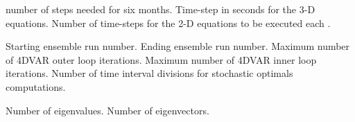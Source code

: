 \begin{klist}
\begin{klist}
     number of steps needed for six months.
               Time-step in seconds for the 3-D equations.
          Number of time-steps for the 2-D equations
     to be executed each .
     \end{klist}
    \mbox{}
     \begin{klist}
        Starting ensemble run number.
        Ending ensemble run number.
        Maximum number of 4DVAR outer loop iterations.
        Maximum number of 4DVAR inner loop iterations.
        Number of time interval divisions for
       stochastic optimals computations.
     \end{klist}
    \mbox{}
     \begin{klist}
        Number of eigenvalues.
        Number of eigenvectors.
     \end{klist}
    \mbox{}


\end{klist}
